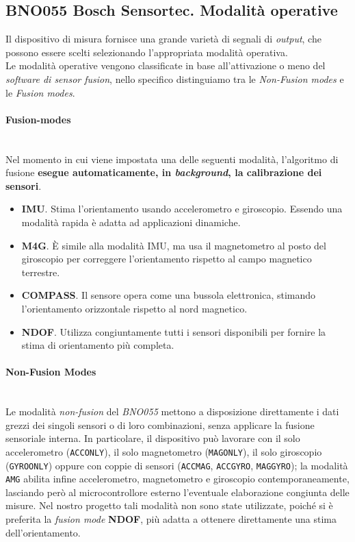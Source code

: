 \documentclass[11pt]{report}
\begin{document}
	\subsection{BNO055 Bosch Sensortec. Modalità operative}
	Il dispositivo di misura fornisce una grande varietà di segnali di \textit{output}, che possono essere scelti selezionando l'appropriata modalità operativa.\\
	Le modalità operative vengono classificate in base all'attivazione o meno del \textit{software di sensor fusion}, nello specifico distinguiamo tra le \textit{Non-Fusion modes} e le \textit{Fusion modes}.
	\paragraph{Fusion-modes}\mbox{}\\
	Nel momento in cui viene impostata una delle seguenti modalità, l'algoritmo di fusione \textbf{esegue automaticamente, in \textit{background}, la calibrazione dei sensori}.
	\begin{itemize}
		\item \textbf{IMU}. Stima l'orientamento usando accelerometro e giroscopio. Essendo una modalità rapida è adatta ad applicazioni dinamiche.
		\item \textbf{M4G}. È simile alla modalità IMU, ma usa il magnetometro al posto del giroscopio per correggere l'orientamento rispetto al campo magnetico terrestre.
		\item \textbf{COMPASS}. Il sensore opera come una bussola elettronica, stimando l'orientamento orizzontale rispetto al nord magnetico.
		\item \textbf{NDOF}. Utilizza congiuntamente tutti i sensori disponibili per fornire la stima di orientamento più completa.
	\end{itemize}
	
	\paragraph{Non-Fusion Modes}\mbox{}\\
	Le modalità \textit{non-fusion} del \textit{BNO055} mettono a disposizione direttamente i dati grezzi dei singoli sensori o di loro combinazioni, senza applicare la fusione sensoriale interna. In particolare, il dispositivo può lavorare con il solo accelerometro (\texttt{ACCONLY}), il solo magnetometro (\texttt{MAGONLY}), il solo giroscopio (\texttt{GYROONLY}) oppure con coppie di sensori (\texttt{ACCMAG}, \texttt{ACCGYRO}, \texttt{MAGGYRO}); la modalità \texttt{AMG} abilita infine accelerometro, magnetometro e giroscopio contemporaneamente, lasciando però al microcontrollore esterno l'eventuale elaborazione congiunta delle misure. Nel nostro progetto tali modalità non sono state utilizzate, poiché si è preferita la \textit{fusion mode} \textbf{NDOF}, più adatta a ottenere direttamente una stima dell'orientamento.
	
\end{document}
